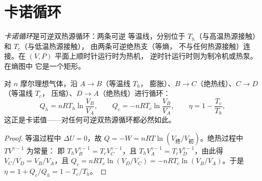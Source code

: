 \section{卡诺循环}

\begin{definition}[卡诺循环]\label{def:b1:heat-engines:carnotcycle}
\emph{卡诺循环}是可逆双热源循环：两条可逆
等温线，分别位于 $T_h$（与高温热源接触）和 $T_c$（与低温热源接触），
由两条可逆绝热支（等熵，
不与任何热源接触）连接。在 $(V, P)$ 平面上顺时针运行时为热机，
逆时针运行时则为制冷机或热泵。在熵图中
它是一个矩形。
\end{definition}

\begin{proposition}[理想气体的卡诺循环]\label{prop:b1:heat-engines:carnotgas}
对 $n$ 摩尔理想气体，沿 $A \to B$（等温线 $T_h$，
膨胀）、$B \to C$（绝热线）、$C \to D$（等温线 $T_c$，
压缩）、$D \to A$（绝热线）进行循环：
\[
Q_h = nRT_h\ln\frac{V_B}{V_A}, \qquad
Q_c = -nRT_c\ln\frac{V_B}{V_A}, \qquad
\eta = 1 - \frac{T_c}{T_h} ,
\]
这正是卡诺值——对任何可逆双热源循环都必然如此。
\end{proposition}

\begin{proof}
等温过程中 $\Delta U = 0$，故 $Q = -W = nRT\ln(V_{\text{终}}/
V_{\text{初}})$。绝热过程中 $TV^{\gamma-1}$ 为常量：
即 $T_hV_B^{\gamma-1} = T_cV_C^{\gamma-1}$，且 $T_hV_A^{\gamma-1} =
T_cV_D^{\gamma-1}$，由此得 $V_C/V_D = V_B/V_A$，且 $Q_c = nRT_c\ln(V_D/V_C) =
-nRT_c\ln(V_B/V_A)$。于是 $\eta = 1 + Q_c/Q_h = 1 - T_c/T_h$。
\end{proof}

